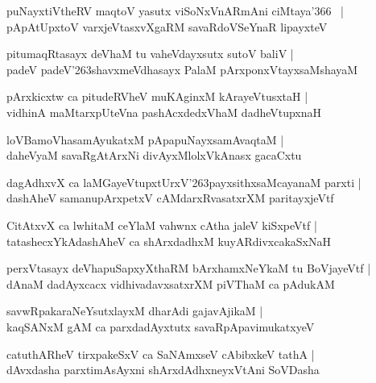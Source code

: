 \documentclass[twoside,12pt,openright]{book}
\def\S{\char'263}
\newcounter{shloka}[chapter]
\begin{document}
\begin{shloka}%
puNayxtiVtheRV maqtoV yasutx viSoNxVnARmAni ciMtaya\char'366 ~|\\
pApAtUpxtoV varxjeVtasxvXgaRM savaRdoVSeYnaR lipayxteV 
\end{shloka}

\begin{shloka}%
pitumaqRtasayx deVhaM tu vaheVdayxsutx sutoV baliV |\\
padeV padeV\S shavxmeVdhasayx PalaM pArxponxVtayxsaMshayaM 
\end{shloka}

\begin{shloka}%
pArxkicxtw ca pitudeRVheV muKAginxM kArayeVtusxtaH |\\
vidhinA maMtarxpUteVna pashAcxdedxVhaM dadheVtupxnaH
\end{shloka}

\begin{shloka}%
loVBamoVhasamAyukatxM pApapuNayxsamAvaqtaM |\\
daheVyaM savaRgAtArxNi divAyxMlolxVkAnasx gacaCxtu 
\end{shloka}

\begin{shloka}%
dagAdhxvX ca laMGayeVtupxtUrxV\S payxsithxsaMcayanaM parxti |\\
dashAheV samanupArxpetxV cAMdarxRvasatxrXM paritayxjeVtf
\end{shloka}

\begin{shloka}%
CitAtxvX ca lwhitaM ceYlaM vahwnx cAtha jaleV kiSxpeVtf |\\
tatashecxYkAdashAheV ca shArxdadhxM kuyARdivxcakaSxNaH 
\end{shloka}

\begin{shloka}%
perxVtasayx deVhapuSapxyXthaRM bArxhamxNeYkaM tu BoVjayeVtf |\\
dAnaM dadAyxcacx vidhivadavxsatxrXM piVThaM ca pAdukAM 
\end{shloka}

\begin{shloka}%
savwRpakaraNeYsutxlayxM dharAdi gajavAjikaM |\\
kaqSANxM gAM ca parxdadAyxtutx savaRpApavimukatxyeV 
\end{shloka}

\begin{shloka}%
catuthARheV tirxpakeSxV ca SaNAmxseV cAbibxkeV tathA |\\
dAvxdasha parxtimAsAyxni shArxdAdhxneyxVtAni SoVDasha
\end{shloka}
\end{document}
